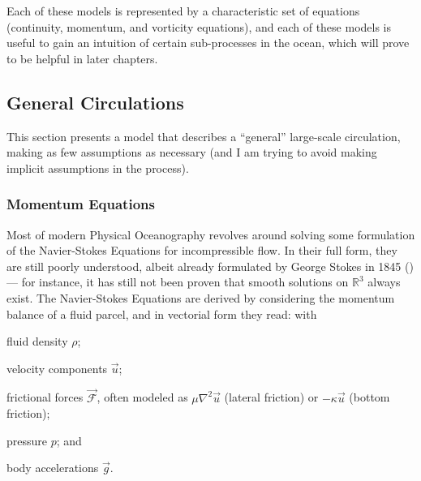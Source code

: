 Each of these models is represented by a characteristic set of equations (continuity, momentum, and vorticity equations), and each of these models is useful to gain an intuition of certain sub-processes in the ocean, which will prove to be helpful in later chapters.

\subsection{General Circulations}
\label{sec:generaleq}
This section presents a model that describes a \enquote{general} large-scale circulation, making as few assumptions as necessary (and I am trying to avoid making implicit assumptions in the process).

\subsubsection{Momentum Equations}
Most of modern Physical Oceanography revolves around solving some formulation of the Navier-Stokes Equations for incompressible flow. In their full form, they are still poorly understood, albeit already formulated by George Stokes in 1845 (\cite{joseph}) --- for instance, it has still not been proven that smooth solutions on \(\mathbb{R}^3\) always exist. The Navier-Stokes Equations are derived by considering the momentum balance of a fluid parcel, and in vectorial form they read:
%
with
\begin{items}
	\item fluid density \(\rho\);
	\item velocity components \(\vec{u}\);
	\item frictional forces \(\vec{\mathcal{F}}\), often modeled as \(\mu \nabla^2 \vec{u}\) (lateral friction) or \(- \kappa \vec{u}\) (bottom friction);
	\item pressure \(p\); and
	\item body accelerations \(\vec{g}\).
\end{items}

